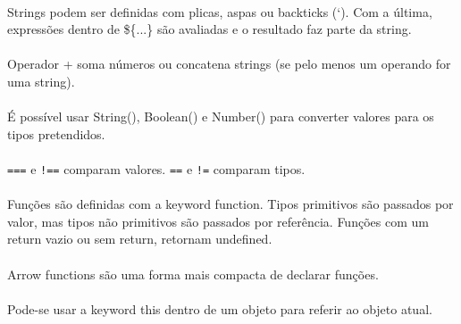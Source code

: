 \documentclass[../resumosLTW.tex]{subfiles}
\begin{document}
\paragraph{}

Strings podem ser definidas com plicas, aspas ou backticks (`). Com a última, expressões dentro de \$\{...\} são avaliadas e o resultado faz parte da string.

\paragraph{}

Operador + soma números ou concatena strings (se pelo menos um operando for uma string).

\paragraph{}

É possível usar String(), Boolean() e Number() para converter valores para os tipos pretendidos.

\paragraph{}

\lstinline{===} e \lstinline{!==} comparam valores. 
\lstinline{==} e \lstinline{!=} comparam tipos.

\paragraph{}

Funções são definidas com a keyword function. Tipos primitivos são passados por valor, mas tipos não primitivos são passados por referência. Funções com um return vazio ou sem return, retornam undefined.

\paragraph{}

Arrow functions são uma forma mais compacta de declarar funções.

\paragraph{}

Pode-se usar a keyword this dentro de um objeto para referir ao objeto atual.

\paragraph{}
\end{document}
